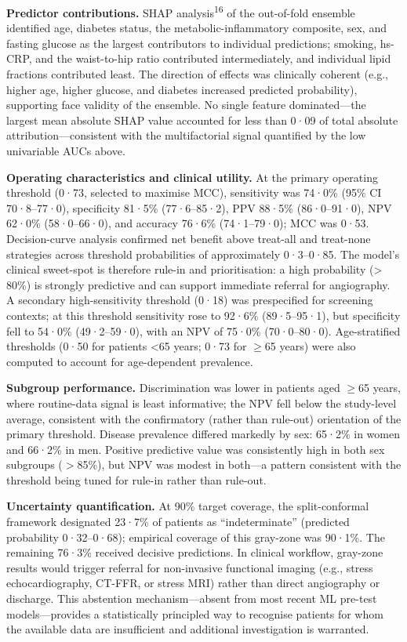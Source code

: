 \documentclass[english,11pt]{article}
\begin{document}
\medskip
\noindent\textbf{Predictor contributions.}
SHAP analysis\textsuperscript{16} of the out-of-fold ensemble identified age, diabetes status, the metabolic-inflammatory composite, sex, and fasting glucose as the largest contributors to individual predictions; smoking, hs-CRP, and the waist-to-hip ratio contributed intermediately, and individual lipid fractions contributed least. The direction of effects was clinically coherent (e.g., higher age, higher glucose, and diabetes increased predicted probability), supporting face validity of the ensemble. No single feature dominated---the largest mean absolute SHAP value accounted for less than 0·09 of total absolute attribution---consistent with the multifactorial signal quantified by the low univariable AUCs above.

\textbf{Operating characteristics and clinical utility.}
At the primary operating threshold (0·73, selected to maximise MCC), sensitivity was 74·0\% (95\% CI 70·8--77·0), specificity 81·5\% (77·6--85·2), PPV 88·5\% (86·0--91·0), NPV 62·0\% (58·0--66·0), and accuracy 76·6\% (74·1--79·0); MCC was 0·53. Decision-curve analysis confirmed net benefit above treat-all and treat-none strategies across threshold probabilities of approximately 0·3--0·85. The model's clinical sweet-spot is therefore rule-in and prioritisation: a high probability (>\,80\%) is strongly predictive and can support immediate referral for angiography. A secondary high-sensitivity threshold (0·18) was prespecified for screening contexts; at this threshold sensitivity rose to 92·6\% (89·5--95·1), but specificity fell to 54·0\% (49·2--59·0), with an NPV of 75·0\% (70·0--80·0). Age-stratified thresholds (0·50 for patients \textless65 years; 0·73 for $\geq$65 years) were also computed to account for age-dependent prevalence.

\textbf{Subgroup performance.}
Discrimination was lower in patients aged $\geq$65 years, where routine-data signal is least informative; the NPV fell below the study-level average, consistent with the confirmatory (rather than rule-out) orientation of the primary threshold. Disease prevalence differed markedly by sex: 65·2\% in women and 66·2\% in men. Positive predictive value was consistently high in both sex subgroups ($>$85\%), but NPV was modest in both---a pattern consistent with the threshold being tuned for rule-in rather than rule-out.

\textbf{Uncertainty quantification.}
At 90\% target coverage, the split-conformal framework designated 23·7\% of patients as ``indeterminate'' (predicted probability 0·32--0·68); empirical coverage of this gray-zone was 90·1\%. The remaining 76·3\% received decisive predictions. In clinical workflow, gray-zone results would trigger referral for non-invasive functional imaging (e.g., stress echocardiography, CT-FFR, or stress MRI) rather than direct angiography or discharge. This abstention mechanism---absent from most recent ML pre-test models---provides a statistically principled way to recognise patients for whom the available data are insufficient and additional investigation is warranted.
\end{document}
